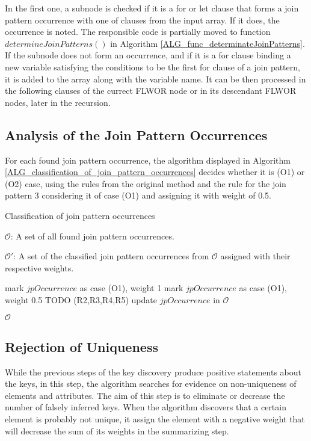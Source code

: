In the first one, a subnode is checked if it is a for or let clause that forms a join pattern occurrence with one of clauses from the input array. If it does, the occurrence is noted. The responsible code is partially moved to function $determineJoinPatterns()$ in Algorithm \ref{ALG_func_determinateJoinPatterns}. If the subnode does not form an occurrence, and if it is a for clause binding a new variable satisfying the conditions to be the first for clause of a join pattern, it is added to the array along with the variable name. It can be then processed in the following clauses of the currect FLWOR node or in its descendant FLWOR nodes, later in the recursion.

\subsection{Analysis of the Join Pattern Occurrences}
For each found join pattern occurrence, the algorithm displayed in Algorithm \ref{ALG_classification_of_join_pattern_occurrences} decides whether it is (O1) or (O2) case, using the rules from the original method and the rule for the join pattern 3 considering it of case (O1) and assigning it with weight of 0.5.

\begin{algorithm}
\caption{Classification of join pattern occurrences}
\label{ALG_classification_of_join_pattern_occurrences}
\begin{algorithmic}[1]
\REQUIRE $\mathcal{O}$: A set of all found join pattern occurrences.

\ENSURE $\mathcal{O'}$: A set of the classified join pattern occurrences from $\mathcal{O}$ assigned with their respective weights.

        \STATE mark $jpOccurrence$ as case (O1), weight 1
        \STATE mark $jpOccurrence$ as case (O1), weight 0.5
    \ELSE
        \STATE TODO (R2,R3,R4,R5)
    \ENDIF
    \STATE update $jpOccurrence$ in $\mathcal{O}$
\ENDFOR

\RETURN $\mathcal{O}$
\end{algorithmic}
\end{algorithm}

\subsection{Rejection of Uniqueness}
While the previous steps of the key discovery produce positive statements about the keys, in this step, the algorithm searches for evidence on non-uniqueness of elements and attributes. The aim of this step is to eliminate or decrease the number of falsely inferred keys.
When the algorithm discovers that a certain element is probably not unique, it assign the element with a negative weight that will decrease the sum of its weights in the summarizing step.

